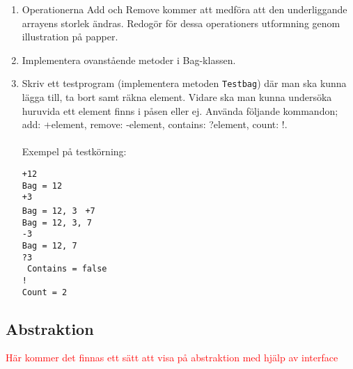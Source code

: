 \documentclass{article}
\begin{document}
    \begin{enumerate}
    	          \item Operationerna Add och Remove kommer att medföra att den underliggande arrayens storlek ändras. Redogör för dessa operationers utformning genom illustration på papper.
    	          \item Implementera ovanstående metoder i Bag-klassen.	  
    	          \item Skriv ett testprogram (implementera metoden \texttt{Testbag}) där man ska kunna lägga till, ta bort samt räkna element. Vidare ska man kunna undersöka huruvida ett element finns i påsen eller ej. Använda följande kommandon; add: +element, remove: -element,
    	          contains: ?element, count: !. 
    	          \\\\
    	          Exempel på testkörning:
    	          
    	          \texttt{+12}\\
    	          \texttt{Bag = 12 }\\
    	          \texttt{+3} \\
    	          \texttt{Bag =  12, 3 }
    	          \texttt{+7}\\
    	          \texttt{Bag = 12, 3, 7 }\\
    	          \texttt{-3}\\
    	          \texttt{Bag =  12, 7 }\\
    	          \texttt{?3} \\
    	          \texttt{ Contains = false} \\
    	          \texttt{!}\\
    	          \texttt{Count = 2}\\
    	          
    	              
     \end{enumerate}

  \subsection*{Abstraktion}
\textcolor{red}{Här kommer det finnas ett sätt att visa på abstraktion med hjälp av interface}
\end{document}
